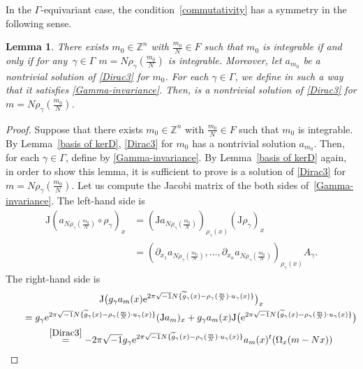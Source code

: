 \documentclass[10pt,a4paper]{amsart}
\numberwithin{equation}{section}
\newtheorem{Lemma}[Theorem]{Lemma}
\newcommand{\Z}{\mathbb{Z}}
\renewcommand{\tilde}{\widetilde}
\def\J{\mathrm{J}}
\begin{document}
In the $\Gamma$-equivariant case, the condition~\eqref{commutativity} has a symmetry in the following sense.
\begin{Lemma}\label{equiv commutativity}
There exists $m_0\in \Z^n$  with $\frac{m_0}{N}\in F$ such that $m_0$ is integrable if and only if for any~${\gamma\in \Gamma}$ $m=N\rho_\gamma (\frac{m_0}{N})$
is integrable. Moreover, let $a_{m_0}$ be a nontrivial solution of \eqref{Dirac3} for $m_0$. For each $\gamma \in \Gamma$, we define  in such a way that it satisfies \eqref{Gamma-invariance}. Then,  is a nontrivial solution of \eqref{Dirac3} for $m=N\rho_\gamma (\frac{m_0}{N})$.
\end{Lemma}
\begin{proof}
Suppose that there exists $m_0\in \Z^n$ with $\frac{m_0}{N}\in F$ such that $m_0$ is integrable. By Lemma~\ref{basis of kerD}, \eqref{Dirac3} for $m_0$ has a nontrivial solution $a_{m_0}$. Then, for each $\gamma \in \Gamma$, define  by \eqref{Gamma-invariance}. By Lemma~\ref{basis of kerD} again, in order to show this lemma, it is sufficient to prove  is a solution of \eqref{Dirac3} for $m=N\rho_\gamma (\frac{m_0}{N})$. Let us compute the Jacobi matrix of the both sides of~\eqref{Gamma-invariance}. The left-hand side is
\begin{align}
\J (a_{N\rho_\gamma (\frac{m_0}{N})}\circ \rho_\gamma )_x
&= (\J a_{N\rho_\gamma (\frac{m_0}{N})} )_{\rho_\gamma(x)} (\J \rho_\gamma )_x\nonumber \\
&= (\partial_{x_1}a_{N\rho_\gamma (\frac{m_0}{N})}, \ldots , \partial_{x_n}a_{N\rho_\gamma (\frac{m_0}{N})} )_{\rho_\gamma (x)}A_\gamma . \label{LHS}
\end{align}
The right-hand side is
\begin{gather}
\J \bigl(g_\gamma a_m(x){\rm e}^{2\pi\sqrt{-1}N\{ {\tilde g}_\gamma(x)-\rho_\gamma(\frac{m}{N})\cdot u_\gamma (x)\}}\bigr)_x \nonumber\\
\qquad=g_\gamma {\rm e}^{2\pi\sqrt{-1}N\{ {\tilde g}_\gamma(x)-\rho_\gamma(\frac{m}{N})\cdot u_\gamma (x)\}}(\J a_m)_x +g_\gamma a_m(x)\J \bigl( {\rm e}^{2\pi\sqrt{-1}N\{ {\tilde g}_\gamma(x)-\rho_\gamma(\frac{m}{N})\cdot u_\gamma (x)\}}\bigr) \nonumber \\
\qquad\stackrel{\eqref{Dirac3}}{=}-2\pi\sqrt{-1}g_\gamma {\rm e}^{2\pi\sqrt{-1}N\{ {\tilde g}_\gamma(x)-\rho_\gamma(\frac{m}{N})\cdot u_\gamma (x)\}}a_m(x) {}^t(\Omega_x(m-Nx))\nonumber \\

\end{gather}
\end{proof}
\end{document}

